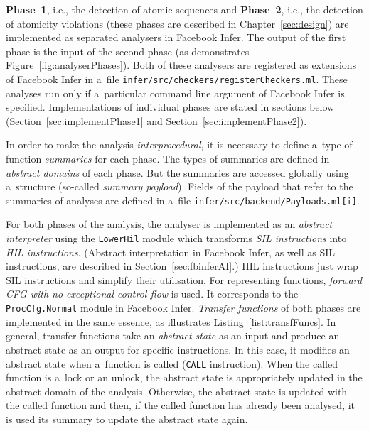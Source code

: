 \textbf{Phase~1}, i.e., the detection of atomic sequences and \textbf{Phase~2},
i.e., the detection of atomicity violations (these phases are described
in Chapter~\ref{sec:design}) are implemented as separated analysers
in Facebook Infer. The output of the first phase is the input of
the second phase (as demonstrates Figure~\ref{fig:analyserPhases}). Both of
these analysers are registered as extensions of Facebook Infer in a~file
\texttt{infer/src/checkers/registerCheckers.ml}. These analyses run only
if a~particular command line argument of Facebook Infer is specified.
Implementations of individual phases are stated in sections below
(Section~\ref{sec:implementPhase1} and Section~\ref{sec:implementPhase2}).

In order to make the analysis \emph{interprocedural}, it is necessary to
define a~type of function \emph{summaries} for each phase.
The types of summaries are defined in \emph{abstract domains} of
each phase. But the summaries are accessed globally using a~structure
(so-called \emph{summary payload}). Fields of the payload that refer to
the summaries of analyses are defined in a~file
\texttt{infer/src/backend/Payloads.ml[i]}.

For both phases of the analysis, the analyser is implemented as an
\emph{abstract interpreter} using the \texttt{LowerHil} module which
transforms \emph{SIL instructions} into \emph{HIL instructions}.
(Abstract interpretation in Facebook Infer, as well as SIL instructions,
are described in Section~\ref{sec:fbinferAI}.) HIL instructions
just wrap SIL instructions and simplify their utilisation. For
representing functions, \emph{forward CFG with no exceptional
control-flow} is used. It corresponds to the \texttt{ProcCfg.Normal}
module in Facebook Infer. \emph{Transfer functions} of both phases
are implemented in the same essence, as illustrates
Listing~\ref{list:transfFuncs}. In general, transfer functions
take an \emph{abstract state} as an input and produce an abstract state
as an output for specific instructions. In this case, it modifies an
abstract state when a~function is called (\texttt{CALL} instruction).
When the called function is a~lock or an unlock, the abstract state is
appropriately updated in the abstract domain of the analysis. Otherwise,
the abstract state is updated with the called function and then, if
the called function has already been analysed, it is used its summary
to update the abstract state again.

